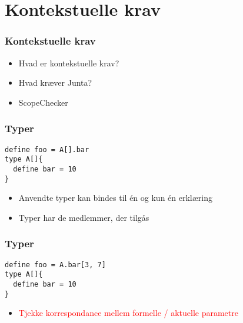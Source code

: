 \section{Kontekstuelle krav}

\begin{frame}
\frametitle{Kontekstuelle krav}
\begin{center}
\begin{itemize}
\item Hvad er kontekstuelle krav?
\item Hvad kræver Junta?
\item ScopeChecker
\end{itemize}
\end{center}
\end{frame}


\begin{frame}[fragile]
\frametitle{Typer}
\begin{lstlisting}
define foo = A[].bar
type A[]{
  define bar = 10
}
\end{lstlisting}
\begin{center}
\begin{itemize}                                  
\item Anvendte typer kan bindes til én og kun én erklæring
\item Typer har de medlemmer, der tilgås
\end{itemize}
\end{center}
\end{frame}

\begin{frame}[fragile]

\end{frame}

\begin{frame}[fragile]
\frametitle{Typer}
\begin{lstlisting}
define foo = A.bar[3, 7]
type A[]{
  define bar = 10
}
\end{lstlisting}
\begin{center}

\begin{itemize}                                  
\item \textcolor{red}{Tjekke korrespondance mellem formelle / aktuelle parametre}
\end{itemize}
\end{center}
\end{frame}

